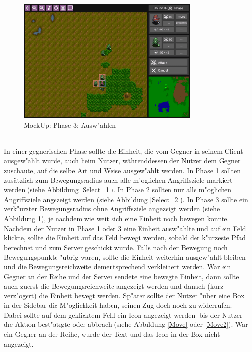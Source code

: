 \documentclass[12pt, titlepage]{scrartcl}
\newcounter{subsubsubsection}[subsubsection]
\begin{document}
			        \begin{figure}[H] 
    				    \centering
    				    \includegraphics[width=0.8\textwidth]{images/mockUps/Select3.png}
    				    \caption{MockUp: Phase 3: Ausw"ahlen}
    				    \label{Select_3}
			        \end{figure} 
		            \ \\ In einer gegnerischen Phase sollte die Einheit, die vom Gegner in seinem Client ausgew"ahlt wurde, auch beim Nutzer, w\"ahrenddessen der Nutzer dem Gegner zuschaute, auf die selbe Art und Weise ausgew"ahlt werden. In Phase 1 sollten zus\"atzlich zum Bewegungsradius auch alle m"oglichen Angriffsziele markiert werden (siehe Abbildung \ref{Select_1}). In Phase 2 sollten nur alle m"oglichen Angriffsziele angezeigt werden (siehe Abbildung \ref{Select_2}). In Phase 3 sollte ein verk"urzter Bewegungsradius ohne Angriffsziele angezeigt werden (siehe Abbildung \ref{Select_3}), je nachdem wie weit sich eine Einheit noch bewegen konnte.
                    Nachdem der Nutzer in Phase 1 oder 3 eine Einheit ausw"ahlte und auf ein Feld klickte, sollte die Einheit auf das Feld bewegt werden, sobald der k"urzeste Pfad berechnet und zum Server geschickt wurde. Falls nach der Bewegung noch Bewegungspunkte "ubrig waren, sollte die Einheit weiterhin ausgew"ahlt bleiben und die Bewegungsreichweite dementsprechend verkleinert werden. War ein Gegner an der Reihe und der Server sendete eine bewegte Einheit, dann sollte auch zuerst die Bewegungsreichweite angezeigt werden und danach (kurz verz"ogert) die Einheit bewegt werden. Sp"ater sollte der Nutzer "uber eine Box in der Sidebar die M"oglichkeit haben, seinen Zug doch noch zu widerrufen. Dabei sollte auf dem geklicktem Feld ein Icon angezeigt werden, bis der Nutzer die Aktion best"atigte oder abbrach (siehe Abbildung \ref{Move} oder \ref{Move2}). War ein Gegner an der Reihe, wurde der Text und das Icon in der Box nicht angezeigt.
\end{document}
